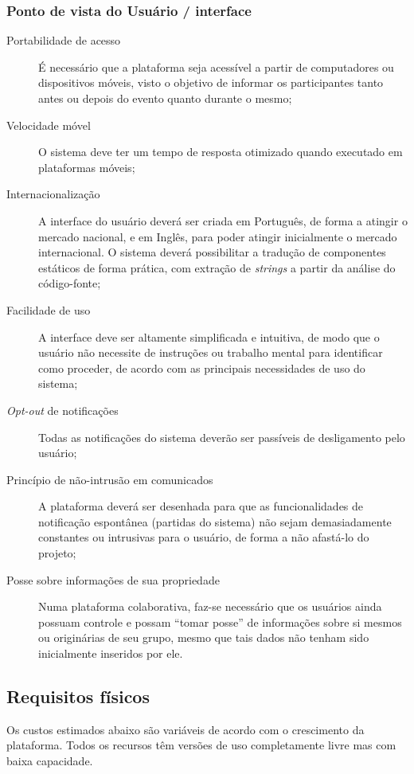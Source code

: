 \documentclass[12pt,a4paper,twoside,hyphens,english,brazil]{abntex2}
\begin{document}
\subsubsection*{Ponto de vista do Usuário / interface}
\begin{description}
	\item[Portabilidade de acesso]
		É necessário que a plataforma seja acessível a partir de computadores ou dispositivos móveis, visto o objetivo de informar os participantes tanto antes ou depois do evento quanto durante o mesmo;
	\item[Velocidade móvel]
		O sistema deve ter um tempo de resposta otimizado quando executado em plataformas móveis;
	\item[Internacionalização]
		A interface do usuário deverá ser criada em Português, de forma a atingir o mercado nacional, e em Inglês, para poder atingir inicialmente o mercado internacional. O sistema deverá possibilitar a tradução de componentes estáticos de forma prática, com extração de \emph{strings} a partir da análise do código-fonte;
	\item[Facilidade de uso]
		A interface deve ser altamente simplificada e intuitiva, de modo que o usuário não necessite de instruções ou trabalho mental para identificar como proceder, de acordo com as principais necessidades de uso do sistema;
	\item[\emph{Opt-out} de notificações]
		Todas as notificações do sistema deverão ser passíveis de desligamento pelo usuário;
	\item[Princípio de não-intrusão em comunicados]
		A plataforma deverá ser desenhada para que as funcionalidades de notificação espontânea (partidas do sistema) não sejam demasiadamente constantes ou intrusivas para o usuário, de forma a não afastá-lo do projeto;
	\item[Posse sobre informações de sua propriedade]
		Numa plataforma colaborativa, faz-se necessário que os usuários ainda possuam controle e possam ``tomar posse'' de informações sobre si mesmos ou originárias de seu grupo, mesmo que tais dados não tenham sido inicialmente inseridos por ele.
\end{description}

\subsection{Requisitos físicos}
Os custos estimados abaixo são variáveis de acordo com o crescimento da plataforma. Todos os recursos têm versões de uso completamente livre mas com baixa capacidade.
\end{document}
